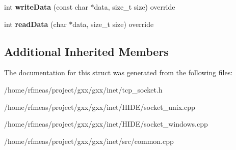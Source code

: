 \begin{DoxyCompactItemize}
\item 
int {\bfseries write\+Data} (const char $\ast$data, size\+\_\+t size) override\hypertarget{structgxx_1_1inet_1_1tcp__socket_ab41c506bedec52aee782a4436fc31edb}{}\label{structgxx_1_1inet_1_1tcp__socket_ab41c506bedec52aee782a4436fc31edb}

\item 
int {\bfseries read\+Data} (char $\ast$data, size\+\_\+t size) override\hypertarget{structgxx_1_1inet_1_1tcp__socket_a502a3777323ae8530a5ec3dc7b24dd41}{}\label{structgxx_1_1inet_1_1tcp__socket_a502a3777323ae8530a5ec3dc7b24dd41}

\end{DoxyCompactItemize}
\subsection*{Additional Inherited Members}


The documentation for this struct was generated from the following files\+:\begin{DoxyCompactItemize}
\item 
/home/rfmeas/project/gxx/gxx/inet/tcp\+\_\+socket.\+h\item 
/home/rfmeas/project/gxx/gxx/inet/\+H\+I\+D\+E/socket\+\_\+unix.\+cpp\item 
/home/rfmeas/project/gxx/gxx/inet/\+H\+I\+D\+E/socket\+\_\+windows.\+cpp\item 
/home/rfmeas/project/gxx/gxx/inet/src/common.\+cpp\end{DoxyCompactItemize}
